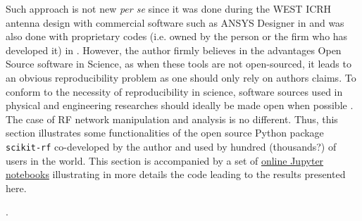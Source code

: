 {Such approach is not new \textit{per se} since it was done during the WEST ICRH antenna design with commercial software such as ANSYS Designer in  and was also done with proprietary codes (i.e. owned by the person or the firm who has developed it) in . However, the author firmly believes in the advantages Open Source software in Science, as when these tools are not open-sourced, it leads to an obvious reproducibility problem as one should only rely on authors claims. To conform to the necessity of reproducibility in science,  software sources used in physical and engineering researches should ideally be made open when possible . The case of RF network manipulation and analysis is no different. Thus, this section illustrates some functionalities of the open source Python package \texttt{scikit-rf} co-developed by the author and used by hundred (thousands?) of users in the world. This section is accompanied by a set of  \href{https://doi.org/10.5281/zenodo.2668370}{online Jupyter notebooks} illustrating in more details the code leading to the results presented here.




. 


}
